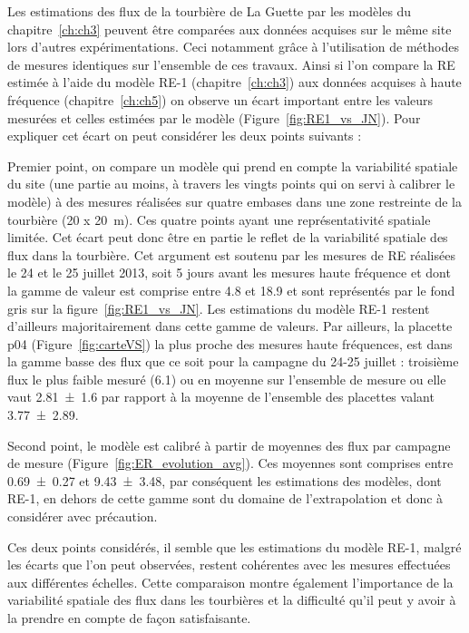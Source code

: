 Les estimations des flux de la tourbière de La Guette par les modèles du chapitre~\ref{ch:ch3} peuvent être comparées aux données acquises sur le même site lors d'autres expérimentations.
Ceci notamment grâce à l'utilisation de méthodes de mesures identiques sur l'ensemble de ces travaux.
Ainsi si l'on compare la RE estimée à l'aide du modèle RE-1 (chapitre~\ref{ch:ch3}) aux données acquises à haute fréquence (chapitre~\ref{ch:ch5}) on observe un écart important entre les valeurs mesurées et celles estimées par le modèle (Figure~\ref{fig:RE1_vs_JN}).
Pour expliquer cet écart on peut considérer les deux points suivants : 

Premier point, on compare un modèle qui prend en compte la variabilité spatiale du site (une partie au moins, à travers les vingts points qui on servi à calibrer le modèle) à des mesures réalisées sur quatre embases dans une zone restreinte de la tourbière (20 x \SI{20}{\metre}).
Ces quatre points ayant une représentativité spatiale limitée.
Cet écart peut donc être en partie le reflet de la variabilité spatiale des flux dans la tourbière.
Cet argument est soutenu par les mesures de RE réalisées le 24 et le 25 juillet 2013, soit 5 jours avant les mesures haute fréquence et dont la gamme de valeur est comprise entre \num{4.8} et \SI{18.9}{\uml} et sont représentés par le fond gris sur la figure~\ref{fig:RE1_vs_JN}.
Les estimations du modèle RE-1 restent d'ailleurs majoritairement dans cette gamme de valeurs.
Par ailleurs, la placette p04 (Figure~\ref{fig:carteVS}) la plus proche des mesures haute fréquences, est dans la gamme basse des flux que ce soit pour la campagne du 24-25 juillet : troisième flux le plus faible mesuré (\SI{6.1}{\uml}) ou en moyenne sur l'ensemble de mesure ou elle vaut \SI{2.81(160)}{\uml} par rapport à la moyenne de l'ensemble des placettes valant \SI{3.77(289)}{\uml}.

Second point, le modèle est calibré à partir de moyennes des flux par campagne de mesure (Figure~\ref{fig:ER_evolution_avg}).
Ces moyennes sont comprises entre \num{0.69(027)} et \SI{9.43(348)}{\uml}, par conséquent les estimations des modèles, dont RE-1, en dehors de cette gamme sont du domaine de l'extrapolation et donc à considérer avec précaution.

Ces deux points considérés, il semble que les estimations du modèle RE-1, malgré les écarts que l'on peut observées, restent cohérentes avec les mesures effectuées aux différentes échelles.
Cette comparaison montre également l'importance de la variabilité spatiale des flux dans les tourbières et la difficulté qu'il peut y avoir à la prendre en compte de façon satisfaisante.


